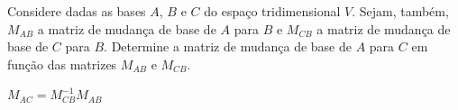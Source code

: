 \begin{exer}
  Considere dadas as bases $A$, $B$ e $C$ do espaço tridimensional $V$. Sejam, também, $M_{AB}$ a matriz de mudança de base de $A$ para $B$ e $M_{CB}$ a matriz de mudança de base de $C$ para $B$. Determine a matriz de mudança de base de $A$ para $C$ em função das matrizes $M_{AB}$ e $M_{CB}$.  
\end{exer}
\begin{resp}
  $M_{AC}=M_{CB}^{-1}M_{AB}$
\end{resp}